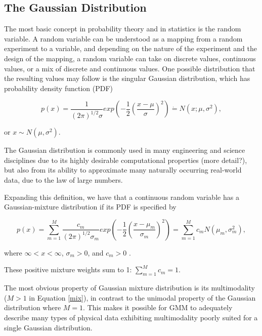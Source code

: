 \documentclass[12pt]{article}
\begin{document}
\label{sec:background}

\hypertarget{the-gaussian-distribution}{%
\subsection{The Gaussian Distribution}\label{the-gaussian-distribution}}

The most basic concept in probability theory and in statistics is the
random variable. A random variable can be understood as a mapping from a
random experiment to a variable, and depending on the nature of the
experiment and the design of the mapping, a random variable can take on
discrete values, continuous values, or a mix of discrete and continuous
values. One possible distribution that the resulting values may follow
is the singular Gaussian distribution, which has probability density
function (PDF)

\begin{equation}
\label{single}
p(x) = \frac{1}{(2\pi)^{1/2} \sigma} exp(-\frac{1}{2}(\frac{x-\mu}{\sigma})^2) \dot{=} N(x; \mu, \sigma^2),
\end{equation}

or \(x \sim N(\mu, \sigma^2)\).

The Gaussian distribution is commonly used in many engineering and
science disciplines due to its highly desirable computational properties
(more detail?), but also from its ability to approximate many naturally
occurring real-world data, due to the law of large numbers.

Expanding this definition, we have that a continuous random variable has
a Gaussian-mixture distribution if its PDF is specified by

\begin{equation}
\label{mix}
p(x) = \sum_{m=1}^M \frac{c_m}{(2\pi)^{1/2} \sigma_m} exp(-\frac{1}{2}(\frac{x-\mu_m}{\sigma_m})^2) = \sum_{m=1}^M c_m N(\mu_m, \sigma_m^2),
\end{equation}

where \(\infty < x < \infty\), \(\sigma_m > 0\), and \(c_m > 0\)
\citep{yu2015gaussian}.

These positive mixture weights sum to 1: \(\sum_{m=1}^M c_m = 1\).

The most obvious property of Gaussian mixture distribution is its
multimodality (\(M>1\) in Equation \ref{mix}), in contrast to the
unimodal property of the Gaussian distribution where \(M=1\). This makes
it possible for GMM to adequately describe many types of physical data
exhibiting multimodality poorly suited for a single Gaussian
distribution.
\end{document}
